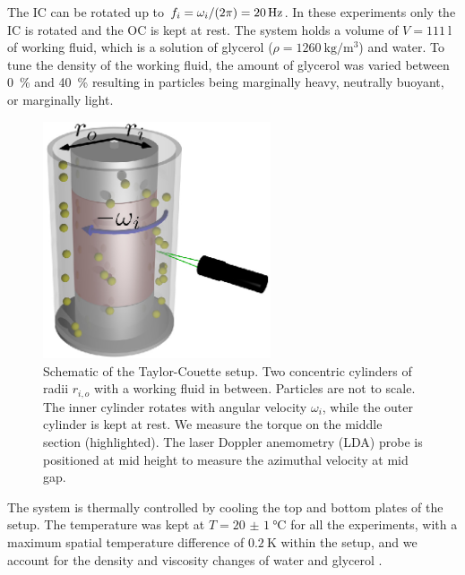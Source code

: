 \documentclass{jfm}
\newcommand{\red}[1]{\textcolor{black}{#1}}
\begin{document}
The IC can be rotated up to $f_i = \omega_i/\red{(}2\pi\red{)} =
\SI{20}{\hertz}$. In these experiments only the IC is rotated and the OC is
kept at rest. The system holds a volume of $V = \SI{111}{\litre}$ of working
fluid, which is a solution of glycerol ($\rho =
\SI{1260}{\kilo\gram/\metre\cubed}$) and water. To tune the density of the
working fluid, the amount of glycerol was varied between \SI{0}{\percent} and
\SI{40}{\percent} result\red{ing} in particles being marginally heavy,
neutrally buoyant, or marginally light.
\begin{figure}
\centering
\includegraphics[height=7cm]{Figures/figure1.eps}
\caption{
Schematic of the Taylor-Couette setup. Two concentric cylinders of radii
$r_{i,o}$ with a working fluid in between. Particles are not to scale. The
inner cylinder rotates with angular velocity $\omega_i$, while the outer
cylinder is kept at rest. We measure the torque on the middle section
(highlighted). The laser Doppler anemometry (LDA) probe is positioned at mid
height to measure the azimuthal velocity at mid gap.}
\label{fig:setup}
\end{figure}
The system is thermally controlled by cooling the top and bottom plates of the
setup. The temperature was kept at $T = \SI{20(1)}{\celsius}$ for all the
experiments, with a maximum spatial temperature difference of
$\SI{0.2}{\kelvin}$ within the setup, and we account for the density and
viscosity changes of water and glycerol \citep{Glycerine1963}.
\end{document}
